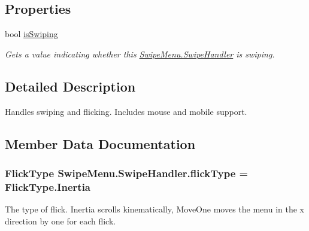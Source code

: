 \subsection*{Properties}
\begin{DoxyCompactItemize}
\item 
bool \hyperlink{class_swipe_menu_1_1_swipe_handler_a659a32477642f780d13b8ec241542bdc}{is\+Swiping}
\begin{DoxyCompactList}\small\item\em Gets a value indicating whether this \hyperlink{class_swipe_menu_1_1_swipe_handler}{Swipe\+Menu.\+Swipe\+Handler} is swiping. \end{DoxyCompactList}\end{DoxyCompactItemize}


\subsection{Detailed Description}
Handles swiping and flicking. Includes mouse and mobile support. 



\subsection{Member Data Documentation}
\hypertarget{class_swipe_menu_1_1_swipe_handler_a002d09a2ce5651f88b4d75b074a3046f}{}
\subsubsection[{flick\+Type}]{\setlength{\rightskip}{0pt plus 5cm}Flick\+Type Swipe\+Menu.\+Swipe\+Handler.\+flick\+Type = Flick\+Type.\+Inertia}\label{class_swipe_menu_1_1_swipe_handler_a002d09a2ce5651f88b4d75b074a3046f}


The type of flick. Inertia scrolls kinematically, Move\+One moves the menu in the x direction by one for each flick. 

\hypertarget{class_swipe_menu_1_1_swipe_handler_a4a407fcf9a1bb1ac38ea8ea928b7345d}{}
